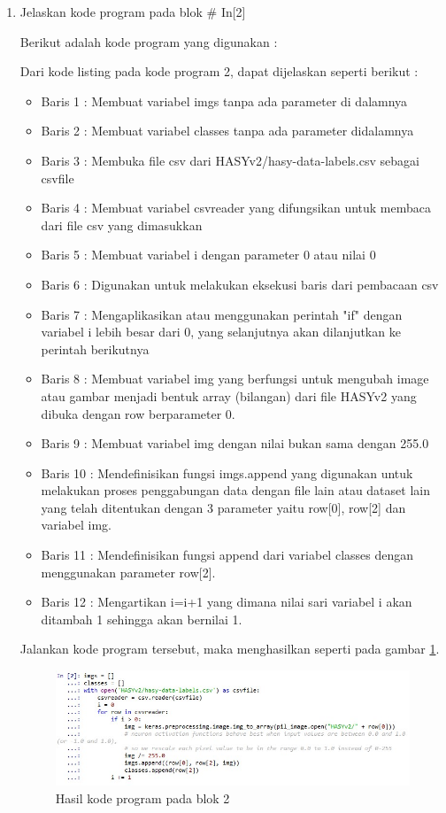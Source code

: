 \begin{enumerate}
\item Jelaskan kode program pada blok \# In[2]
	\par Berikut adalah kode program yang digunakan :
	
	\par Dari kode listing pada kode program 2, dapat dijelaskan seperti berikut :
	\begin{itemize}
	\item Baris 1	: Membuat variabel imgs tanpa ada parameter di dalamnya
	\item Baris 2	: Membuat variabel classes tanpa ada parameter didalamnya
	\item Baris 3	: Membuka file csv dari HASYv2/hasy-data-labels.csv sebagai csvfile
	\item Baris 4	: Membuat variabel csvreader yang difungsikan untuk membaca dari file csv yang dimasukkan
	\item Baris 5	: Membuat variabel i dengan parameter 0 atau nilai 0
	\item Baris 6	: Digunakan untuk melakukan eksekusi baris dari pembacaan csv 
	\item Baris 7	: Mengaplikasikan atau menggunakan perintah "if" dengan variabel i lebih besar dari 0, yang selanjutnya akan dilanjutkan ke perintah berikutnya
	\item Baris 8	: Membuat variabel img yang berfungsi untuk mengubah image atau gambar menjadi bentuk array (bilangan) dari file HASYv2 yang dibuka dengan row berparameter 0.
	\item Baris 9	: Membuat variabel img dengan nilai bukan sama dengan 255.0
	\item Baris 10	: Mendefinisikan fungsi imgs.append yang digunakan untuk melakukan proses penggabungan data dengan file lain atau dataset lain yang telah ditentukan dengan 3 parameter yaitu row[0], row[2] dan variabel img.
	\item Baris 11	: Mendefinisikan fungsi append dari variabel classes dengan menggunakan parameter row[2].
	\item Baris 12	: Mengartikan i=i+1 yang dimana nilai sari variabel i akan ditambah 1 sehingga akan bernilai 1.
	\end{itemize}
	\par Jalankan kode program tersebut, maka menghasilkan seperti pada gambar \ref{andri2}.
		\begin{figure}[!hbtp]
		\centering
		\includegraphics[scale=0.5]{figures/chapter7/andri2.jpg}
		\caption{Hasil kode program pada blok 2}
		\label{andri2}
		\end{figure}
	

\end{enumerate}
